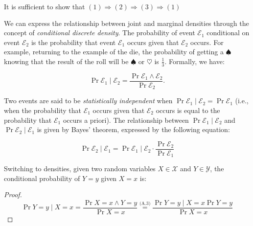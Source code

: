 It is sufficient to show that $(1) \Rightarrow (2) \Rightarrow (3) \Rightarrow (1)$




\begin{tcolorbox}[colframe=black, colback=sfondo_gray, sharp corners]
	
We can express the relationship between joint and marginal densities through the concept of \textit{conditional discrete density}. The probability of event $\mathcal{E}_1$ conditional on event $\mathcal{E}_2$ is the probability that event $\mathcal{E}_1$ occurs given that $\mathcal{E}_2$ occurs. For example, returning to the example of the die, the probability of getting a $\spadesuit$ knowing that the result of the roll will be $\spadesuit$ or $\heartsuit$ is $\frac{1}{3}$. Formally, we have:

\[
\Pr{\mathcal{E}_1 \mid \mathcal{E}_2} = \frac{\Pr{\mathcal{E}_1 \land \mathcal{E}_2}}{\Pr{\mathcal{E}_2}}.
\]

Two events are said to be \textit{statistically independent} when $\Pr{\mathcal{E}_1 \mid \mathcal{E}_2} = \Pr{\mathcal{E}_1}$ (i.e., when the probability that $\mathcal{E}_1$ occurs given that $\mathcal{E}_2$ occurs is equal to the probability that $\mathcal{E}_1$ occurs a priori). The relationship between $\Pr{\mathcal{E}_1 \mid \mathcal{E}_2}$ and $\Pr{\mathcal{E}_2 \mid \mathcal{E}_1}$ is given by Bayes' theorem, expressed by the following equation:

\[
\Pr{\mathcal{E}_2 \mid \mathcal{E}_1} = \Pr{\mathcal{E}_1 \mid \mathcal{E}_2} \cdot \frac{\Pr{\mathcal{E}_2}}{\Pr{\mathcal{E}_1}} \tag{A.3}
\]

Switching to densities, given two random variables $X \in \mathcal{X}$ and $Y \in \mathcal{Y}$, the conditional probability of $Y = y$ given $X = x$ is:
\begin{proof}
\[
\Pr{Y = y \mid X = x} = \frac{\Pr{X = x \land Y = y}}{\Pr{X = x}} \stackrel{\text{(A.3)}}{=} \frac{\Pr{Y = y \mid X = x} \Pr{Y = y}}{\Pr{X = x}}
\]
\end{proof}
\end{tcolorbox}


